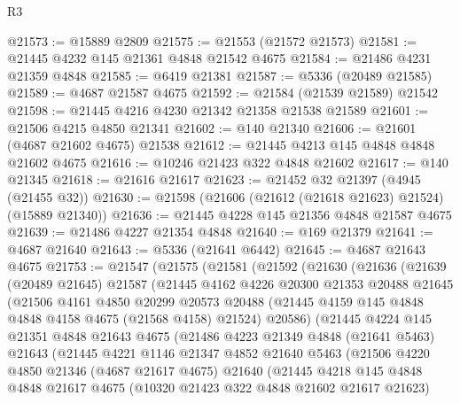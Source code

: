 \begin{lexlean}{R3}
\begin{coremodule}
@21573 := @15889 @2809
@21575 := @21553 (@21572 @21573)
@21581 := @21445 @4232 @145 @21361 @4848 @21542 @4675
@21584 := @21486 @4231 @21359 @4848
@21585 := @6419 @21381
@21587 := @5336 (@20489 @21585)
@21589 := @4687 @21587 @4675
@21592 := @21584 (@21539 @21589) @21542
@21598 := @21445 @4216 @4230 @21342 @21358 @21538 @21589
@21601 := @21506 @4215 @4850 @21341
@21602 := @140 @21340
@21606 := @21601 (@4687 @21602 @4675) @21538
@21612 := @21445 @4213 @145 @4848 @4848 @21602 @4675
@21616 := @10246 @21423 @322 @4848 @21602
@21617 := @140 @21345
@21618 := @21616 @21617
@21623 := @21452 @32 @21397 (@4945 (@21455 @32))
@21630 := @21598 (@21606 (@21612 (@21618 @21623) @21524) (@15889 @21340))
@21636 := @21445 @4228 @145 @21356 @4848 @21587 @4675
@21639 := @21486 @4227 @21354 @4848
@21640 := @169 @21379
@21641 := @4687 @21640
@21643 := @5336 (@21641 @6442)
@21645 := @4687 @21643 @4675
@21753 := @21547
    (@21575
      (@21581
        (@21592
          (@21630
            (@21636
              (@21639
                (@20489 @21645)
                @21587
                (@21445
                  @4162
                  @4226
                  @20300
                  @21353
                  @20488
                  @21645
                  (@21506
                    @4161
                    @4850
                    @20299
                    @20573
                    @20488
                    (@21445 @4159 @145 @4848 @4848 @4158 @4675 (@21568 @4158) @21524)
                    @20586)
                  (@21445
                    @4224
                    @145
                    @21351
                    @4848
                    @21643
                    @4675
                    (@21486
                      @4223
                      @21349
                      @4848
                      (@21641 @5463)
                      @21643
                      (@21445
                        @4221
                        @1146
                        @21347
                        @4852
                        @21640
                        @5463
                        (@21506
                          @4220
                          @4850
                          @21346
                          (@4687 @21617 @4675)
                          @21640
                          (@21445
                            @4218
                            @145
                            @4848
                            @4848
                            @21617
                            @4675
                            (@10320 @21423 @322 @4848 @21602 @21617 @21623)

\end{coremodule}
\end{lexlean}
